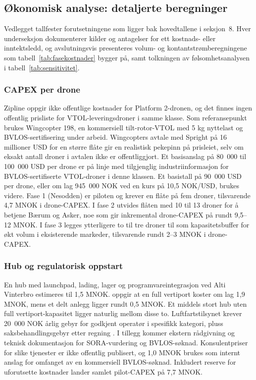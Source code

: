 \subsection{Økonomisk analyse: detaljerte beregninger}
\label{app:okonomi}

Vedlegget tallfester forutsetningene som ligger bak hovedtallene i
seksjon~8. Hver underseksjon dokumenterer kilder og antagelser for ett
kostnads- eller inntektsledd, og avslutningsvis presenteres
volum- og kontantstrømberegningene som tabell~\ref{tab:fasekostnader}
bygger på, samt tolkningen av følsomhetsanalysen i
tabell~\ref{tab:sensitivitet}.

\subsubsection{CAPEX per drone}
\label{app:capex}

Zipline oppgir ikke offentlige kostnader for Platform 2-dronen, og det
finnes ingen offentlig prisliste for VTOL-leveringsdroner i samme
klasse. Som referansepunkt brukes Wingcopter 198, en kommersiell
tilt-rotor-VTOL med 5 kg nyttelast og BVLOS-sertifisering under arbeid.
Wingcopters avtale med Spright på 16 millioner USD for en større flåte
\parencite{verticalmag_wingcopter_spright} gir en realistisk pekepinn
på prisleiet, selv om eksakt antall droner i avtalen ikke er
offentliggjort. Et basisanslag på 80~000 til 100~000 USD per drone er
på linje med tilgjenglig industriinformasjon for BVLOS-sertifiserte
VTOL-droner i denne klassen. Et basistall på 90~000 USD per drone, eller
om lag 945~000 NOK ved en kurs på 10{,}5 NOK/USD, brukes videre. Fase 1 (Nesodden) er piloten og krever en flåte på fem droner,
tilsvarende 4{,}7 MNOK i drone-CAPEX. I fase 2 utvides flåten med 10
til 13 droner for å betjene Bærum og Asker, noe som gir inkremental
drone-CAPEX på rundt 9{,}5--12 MNOK. I fase 3 legges ytterligere to til
tre droner til som kapasitetsbuffer for økt volum i eksisterende
markeder, tilsvarende rundt 2--3 MNOK i drone-CAPEX.

\subsubsection{Hub og regulatorisk oppstart}
\label{app:hub}

En hub med launchpad, lading, lager og programvareintegrasjon ved Alti
Vinterbro estimeres til 1{,}5 MNOK. \textcite{freightamigo2025} oppgir
at en full vertiport koster om lag 1{,}9 MNOK, mens et delt anlegg
ligger rundt 0{,}5 MNOK. Et middels stort hub uten full
vertiport-kapasitet ligger naturlig mellom disse to.
Luftfartstilsynet krever 20~000 NOK årlig gebyr for godkjent operatør i
spesifikk kategori, pluss saksbehandlings\-gebyr etter regning
\parencite{uasnorway2025_gebyr}. I tillegg kommer ekstern rådgivning og
teknisk dokumentasjon for SORA-vurdering og BVLOS-søknad. Konsulentpriser
for slike tjenester er ikke offentlig publisert, og 1{,}0 MNOK brukes
som internt anslag for omfanget av en kommersiell BVLOS-søknad.
Inkludert reserve for uforutsette kostnader lander samlet pilot-CAPEX
på 7{,}7 MNOK.

